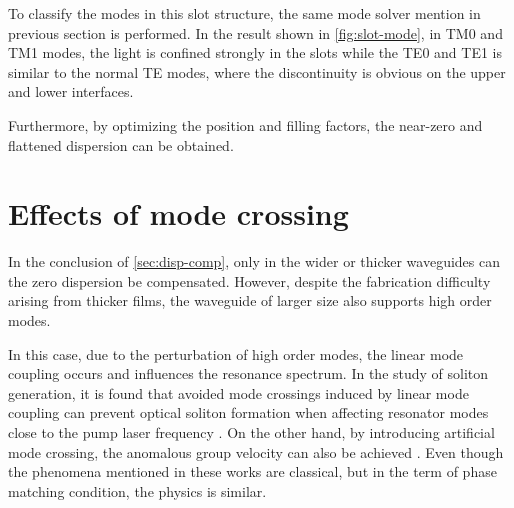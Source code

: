 
To classify the modes in this slot structure, the same mode solver mention in previous section is performed.
In the result shown in \autoref{fig:slot-mode}, in TM0 and TM1 modes, the light is confined strongly in the slots while the TE0 and TE1 is similar to the normal TE modes, where the discontinuity is obvious on the upper and lower interfaces.




Furthermore, by optimizing the position and filling factors, the near-zero and flattened dispersion can be obtained. 


\section{Effects of mode crossing}

In the conclusion of \autoref{sec:disp-comp},
only in the wider or thicker waveguides can the zero dispersion be compensated. However, 
despite the fabrication difficulty arising from thicker films,
the waveguide of larger size also supports high order modes. 

In this case, due to the perturbation of high order modes, the linear mode coupling occurs and influences the resonance spectrum. 
In the study of soliton generation,
it is found that avoided mode crossings induced by linear mode coupling can prevent optical soliton formation when affecting resonator modes close to the pump laser frequency \cites{Herr2014a,Bao2018}. On the other hand, by introducing artificial mode crossing, the anomalous group velocity can also be achieved \cite{Kim2017}. Even though the phenomena mentioned in these works are classical, but in the term of phase matching condition, the physics is similar.

